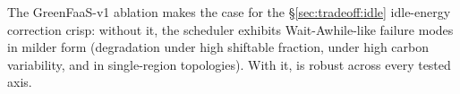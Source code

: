 The GreenFaaS-v1 ablation makes the case for the
\S\ref{sec:tradeoff:idle} idle-energy correction crisp: without it,
the scheduler exhibits Wait-Awhile-like failure modes in milder form
(degradation under high shiftable fraction, under high carbon
variability, and in single-region topologies). With it, \GreenFaaS{}
is robust across every tested axis.
